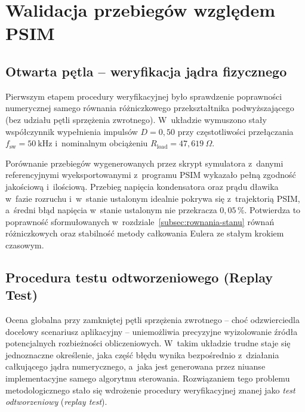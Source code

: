 \section{Walidacja przebiegów względem PSIM}
\label{sec:walidacja-psim}

\subsection{Otwarta pętla -- weryfikacja jądra fizycznego}
\label{subsec:val-openloop}

Pierwszym etapem procedury weryfikacyjnej było sprawdzenie poprawności numerycznej samego równania różniczkowego przekształtnika podwyższającego (bez udziału pętli sprzężenia zwrotnego). W~układzie wymuszono stały współczynnik wypełnienia impulsów $D = 0{,}50$ przy częstotliwości przełączania $f_{\mathrm{sw}} = 50~\mathrm{kHz}$ i~nominalnym obciążeniu $R_{\mathrm{load}} = 47{,}619~\Omega$.

Porównanie przebiegów wygenerowanych przez skrypt symulatora z~danymi referencyjnymi wyeksportowanymi z~programu PSIM wykazało pełną zgodność jakościową i~ilościową. Przebieg napięcia kondensatora oraz prądu dławika w~fazie rozruchu i~w~stanie ustalonym idealnie pokrywa się z~trajektorią PSIM, a~średni błąd napięcia w~stanie ustalonym nie przekracza $0{,}05\,\%$. Potwierdza to poprawność sformułowanych w~rozdziale~\ref{subsec:rownania-stanu} równań różniczkowych oraz stabilność metody całkowania Eulera ze stałym krokiem czasowym.

\subsection{Procedura testu odtworzeniowego (Replay Test)}
\label{subsec:replay-test}

Ocena globalna przy zamkniętej pętli sprzężenia zwrotnego -- choć odzwierciedla docelowy scenariusz aplikacyjny -- uniemożliwia precyzyjne wyizolowanie źródła potencjalnych rozbieżności obliczeniowych. W~takim układzie trudne staje się jednoznaczne określenie, jaka część błędu wynika bezpośrednio z~działania całkującego jądra numerycznego, a~jaka jest generowana przez niuanse implementacyjne samego algorytmu sterowania. Rozwiązaniem tego problemu metodologicznego stało się wdrożenie procedury weryfikacyjnej znanej jako \emph{test odtworzeniowy} (\emph{replay test}).

